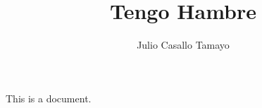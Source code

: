 \documentclass{article}
\author{Julio Casallo Tamayo}
\begin{document}
  \title{Tengo Hambre}
  \maketitle
  This is a document.
\end{document}
